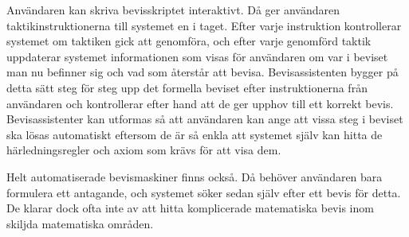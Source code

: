 Användaren kan skriva bevisskriptet interaktivt. Då ger användaren
taktikinstruktionerna till systemet en i taget. Efter varje instruktion
kontrollerar systemet om taktiken gick att genomföra, och efter varje genomförd
taktik uppdaterar systemet informationen som visas för användaren om var i
beviset man nu befinner sig och vad som återstår att bevisa. Bevisassistenten
bygger på detta sätt steg för steg upp det formella beviset efter
instruktionerna från användaren och kontrollerar efter hand att de ger upphov
till ett korrekt bevis.
Bevisassistenter kan utformas så att användaren kan ange att vissa steg i
beviset ska lösas automatiskt eftersom de är så enkla att systemet själv kan
hitta de härledningsregler och axiom som krävs för att visa dem.


Helt automatiserade bevismaskiner finns också. Då behöver användaren bara
formulera ett antagande, och systemet söker sedan själv efter ett bevis för
detta. De klarar dock ofta inte av att hitta komplicerade matematiska bevis
inom skiljda matematiska
områden\cite{geuvers2009proof}\cite{gonthier2009ssreflect}.

